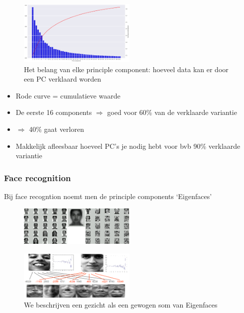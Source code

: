 \documentclass{article}
\begin{document}
\begin{figure}[H]
    \centering
    \includegraphics[width=0.5\textwidth]{pca-variantie.png}
    \caption{Het belang van elke principle component: hoeveel data kan er door een PC verklaard worden}
\end{figure}

\begin{itemize}
    \item Rode curve = cumulatieve waarde
    \item De eerste 16 components $\Rightarrow$ goed voor 60\% van de verklaarde variantie
    \item $\Rightarrow$ 40\% gaat verloren
    \item Makkelijk afleesbaar hoeveel PC's je nodig hebt voor bvb 90\% verklaarde variantie
\end{itemize}


\subsubsection{Face recognition}

Bij face recogntion noemt men de principle components `Eigenfaces'

\begin{figure}[H]
    \centering
    \includegraphics[width=0.5\textwidth]{eigenfaces.png}
\end{figure}

\begin{figure}[H]
    \centering
    \includegraphics[width=0.5\textwidth]{eigenfaces2.png}
    \caption{We beschrijven een gezicht als een gewogen som van Eigenfaces}
\end{figure}
\end{document}
